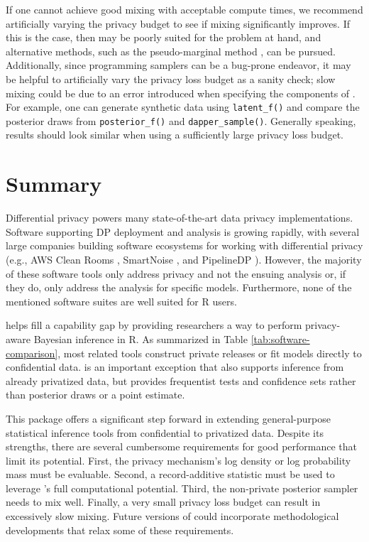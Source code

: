 If one cannot achieve good mixing with acceptable compute
times, we recommend artificially varying the privacy
budget to see if mixing significantly improves.
If this is the case, then  may be poorly suited for the problem at hand,
and alternative methods, such as the pseudo-marginal method \citep{Andrieu2009},
can be pursued.
Additionally, since programming samplers can be a bug-prone endeavor, it may be helpful
to artificially vary the privacy loss budget as a
sanity check; slow mixing could be due to an
error introduced when specifying the components of . For example, one can
generate synthetic data using \texttt{latent\_f()} and compare the posterior
draws from \texttt{posterior\_f()} and \texttt{dapper\_sample()}. Generally speaking,
results should look similar when using a sufficiently large privacy loss budget.

\section{Summary}\label{sec:summary}

Differential privacy powers many state-of-the-art data privacy
implementations. Software supporting DP deployment and analysis
is growing rapidly, with several large companies building software ecosystems for
working with differential privacy
(e.g., AWS Clean Rooms \citep{awscleanrooms2024}, SmartNoise \citep{smartnoise2024}, and PipelineDP \citep{pipelinedp2022}).
However, the majority of these software tools only address privacy and not the
ensuing analysis or, if they do, only address the analysis for specific models.
Furthermore, none of the mentioned software suites are well suited for R users.

 helps fill a capability gap by providing researchers a
way to perform privacy-aware Bayesian inference in R. As summarized in Table
\ref{tab:software-comparison}, most related tools construct private releases
or fit models directly to confidential data.  is an
important exception that also supports inference from already privatized data,
but provides frequentist tests and confidence sets rather than posterior draws
or a point estimate.

This package offers a significant step forward in extending general-purpose statistical inference tools from confidential to privatized data.
Despite its strengths, there are
several cumbersome requirements for good performance that limit its potential.
First, the privacy mechanism's log density or log probability mass must be evaluable.
Second, a record-additive
statistic must be used to leverage 's full computational potential.
Third, the non-private posterior sampler needs to mix well. Finally, a very small privacy loss budget can result in excessively slow mixing.
Future versions of  could incorporate methodological developments that relax some of these requirements.

